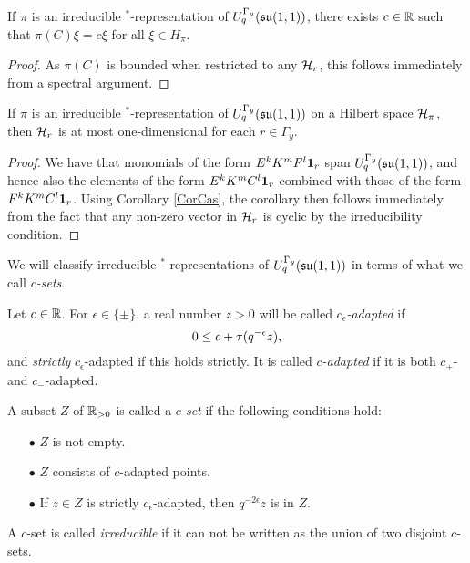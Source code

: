


\begin{Lem}\label{CorCas} If $\pi$ is an irreducible $^*$-representation of $U_q^{\Gamma_y}(\mathfrak{su}(1,1))$, there exists $c\in \mathbb{R}$ such that $\pi(C)\xi = c\xi$ for all $\xi \in H_{\pi}$. 
\end{Lem} 
\begin{proof} As $\pi(C)$ is bounded when restricted to any $\mathcal{H}_r$, this follows immediately from a spectral argument. 
\end{proof} 

\begin{Cor}\label{CorOneDim} If $\pi$ is an irreducible $^*$-representation of $U_q^{\Gamma_y}(\mathfrak{su}(1,1))$ on a Hilbert space $\mathcal{H}_{\pi}$, then $\mathcal{H}_r$ is at most one-dimensional for each $r\in \Gamma_y$. %
\end{Cor} 
\begin{proof} 
We have that monomials of the form $E^kK^mF^l\mathbf{1}_r$ span $U_q^{\Gamma_y}(\mathfrak{su}(1,1))$, and hence also the elements of the form $E^kK^mC^l\mathbf{1}_r$ combined with those of the form $F^kK^mC^l\mathbf{1}_r$. Using Corollary \ref{CorCas}, the corollary then follows immediately from the fact that any non-zero vector in $\mathcal{H}_r$ is cyclic by the irreducibility condition.
\end{proof}

We will classify irreducible $^*$-representations of $U_q^{\Gamma_y}(\mathfrak{su}(1,1))$ in terms of what we call \emph{$c$-sets}.  

\begin{Def}\label{DefAdapt} Let $c\in\mathbb{R}$. For $\epsilon \in \{\pm\}$, a real number $z>0$ will be called \emph{$c_{\epsilon}$-adapted} if \begin{equation}\label{EqAd+}  0 \leq c+ \operatorname{\tau}(q^{-\epsilon}z),\end{equation} and \emph{strictly} $c_{\epsilon}$-adapted if this holds strictly. It is called \emph{$c$-adapted} if it is both $c_+$- and $c_-$-adapted. 

A subset $Z$ of $\mathbb{R}_{>0}$ is called a \emph{$c$-set} if the following conditions hold: \begin{itemize} 
\item[$\bullet$] $Z$ is not empty.
\item[$\bullet$] $Z$ consists of $c$-adapted points.
\item[$\bullet$] If $z\in Z$ is strictly $c_{\epsilon}$-adapted, then $q^{-2\epsilon}z$ is in $Z$.
\end{itemize}
A $c$-set is called \emph{irreducible} if it can not be written as the union of two disjoint $c$-sets.
\end{Def}

